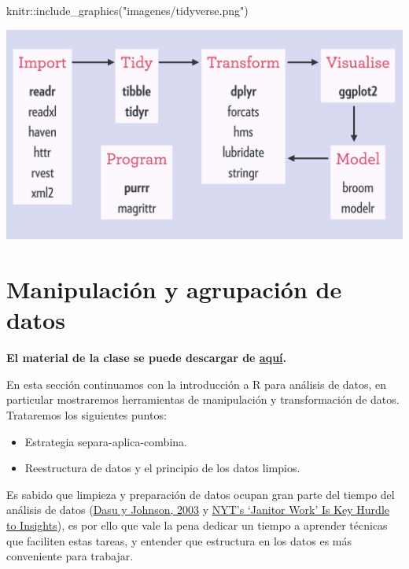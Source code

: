 \documentclass[
]{book}
\newenvironment{Shaded}{\begin{snugshade}}{\end{snugshade}}
\newcommand{\FunctionTok}[1]{\textcolor[rgb]{0.00,0.00,0.00}{#1}}
\newcommand{\NormalTok}[1]{#1}
\newcommand{\SpecialCharTok}[1]{\textcolor[rgb]{0.00,0.00,0.00}{#1}}
\newcommand{\StringTok}[1]{\textcolor[rgb]{0.31,0.60,0.02}{#1}}
\begin{document}
\begin{Shaded}
\begin{Highlighting}[]
\NormalTok{knitr}\SpecialCharTok{::}\FunctionTok{include\_graphics}\NormalTok{(}\StringTok{"imagenes/tidyverse.png"}\NormalTok{)}
\end{Highlighting}
\end{Shaded}

\includegraphics[width=16.12in]{imagenes/tidyverse}

\hypertarget{manipulaciuxf3n-y-agrupaciuxf3n-de-datos}{%
\chapter{Manipulación y agrupación de datos}\label{manipulaciuxf3n-y-agrupaciuxf3n-de-datos}}

\textbf{El material de la clase se puede descargar de \href{https://www.dropbox.com/s/gtxjn5xb39g2n09/02-manipulacion.zip?dl=0}{aquí}.}

En esta sección continuamos con la introducción a R para análisis de datos,
en particular mostraremos herramientas de manipulación y transformación de
datos. Trataremos los siguientes puntos:

\begin{itemize}
\item
  Estrategia separa-aplica-combina.
\item
  Reestructura de datos y el principio de los datos limpios.
\end{itemize}

Es sabido que limpieza y preparación de datos ocupan gran parte del tiempo del
análisis de datos (\href{http://onlinelibrary.wiley.com/book/10.1002/0471448354}{Dasu y Johnson, 2003}
y \href{https://www.nytimes.com/2014/08/18/technology/for-big-data-scientists-hurdle-to-insights-is-janitor-work.html?mcubz=0}{NYT's `Janitor Work' Is Key Hurdle to Insights}),
es por ello que vale la pena dedicar un tiempo a aprender técnicas que faciliten
estas tareas, y entender que estructura en los datos es más conveniente para
trabajar.
\end{document}
